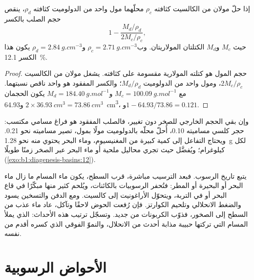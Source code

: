 \begin{proposition}\label{prop:b1:diagenesis-basins:dolomite}
إذا حلّ مولان من الكالسيت كثافته $\rho_c$ محلّهما مول واحد من الدولوميت كثافته $\rho_d$، ينقص حجم الصلب بالكسر
\[
  1 - \frac{M_d/\rho_d}{2M_c/\rho_c},
\]
حيث $M_c$ و$M_d$ الكتلتان المولاريتان. وب$\rho_c = \qty{2.71}{g.cm^{-3}}$ و$\rho_d = \qty{2.84}{g.cm^{-3}}$ يكون هذا الكسر \qty{12.1}{\percent}.
\end{proposition}

\begin{proof}
حجم المول  هو كتلته المولارية مقسومة على كثافته. يشغل مولان من الكالسيت $2M_c/\rho_c$، ومول واحد من الدولوميت $M_d/\rho_d$؛ والكسر المفقود هو واحد ناقص نسبتهما. مع $M_c = \qty{100.09}{g.mol^{-1}}$ و$M_d = \qty{184.40}{g.mol^{-1}}$ يكون الحجمان $2\times\qty{36.93}{cm^3} = \qty{73.86}{cm^3}$ و\qty{64.93}{cm^3}، و$1 - 64.93/73.86 = \num{0.121}$.
\end{proof}

وإن بقي الحجم الخارجي للصخر دون تغيير، فالصلب المفقود هو فراغ مسامي مكتسب: حجر كلسي مساميته \num{0.10}، أُحلّ محلّه بالدولوميت مولًا بمول، تصير مساميته نحو \num{0.21}. ويحتاج التفاعل إلى كمية كبيرة من المغنيسيوم، وماء البحر يحتوي منه نحو \qty{1.28}{g} لكل كيلوغرام؛ ويُفضَّل حيث تجري محاليل ملحية أو ماء البحر عبر الصخر زمنًا طويلًا (\cref{exo:b1:diagenesis-basins:12}).

يتبع  تاريخ الرسوب. فبعد الترسيب مباشرة، قرب السطح، يكون ماء المسام ما زال ماء البحر أو البحيرة أو المطر: فتُحفر الرسوبيات بالكائنات، ويُلحم كثير منها مبكّرًا في قاع البحر أو في التربة، ويتحوّل الأراغونيت إلى كالسيت. ومع الدفن والتسخين يسود  والضغط الانحلالي وتلحيم الكوارتز. فإن رُفعت الحوض لاحقًا وتآكل، عاد ماء عذب من السطح إلى الصخور، فذوّب الكربونات  من جديد. وتسجّل  ترتيب هذه الأحداث:  الذي يملأ المسام التي تركتها حبيبة مذابة أحدث من الانحلال، والنموّ الفوقي الذي كسره  أقدم من  نفسه.

\section{الأحواض الرسوبية}\label{sec:b1:diagenesis-basins:basins}

